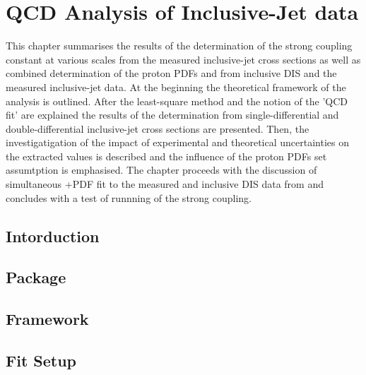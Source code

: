 \section{QCD Analysis of Inclusive-Jet data}
\label{sec:aspdffit}
This chapter summarises the results of the determination of the strong coupling constant at various scales from the measured inclusive-jet cross sections as well as combined determination of the proton PDFs and \asz from inclusive DIS and the measured inclusive-jet data. At the beginning the theoretical framework of the analysis is outlined. After the least-square method and the notion of the 'QCD fit' are explained the results of the \asz determination from single-differential and double-differential inclusive-jet cross sections are presented. Then, the investigatigation of the impact of experimental and theoretical uncertainties on the extracted \asz values is described and the influence of the proton PDFs set assumtption is emphasised. The chapter proceeds with the discussion of simultaneous \as+PDF fit to the measured and inclusive DIS data from \hera and concludes with a test of runnning of the strong coupling.

\subsection{Intorduction}
\label{subsec:qcdfitintro}


\subsection{\herafitter Package}
\label{subsec:herfitter}


\subsection{\fastnlo Framework}
\label{subsec:fastnlo}


%

\subsection{Fit Setup}
\label{subsec:fitsettings}


